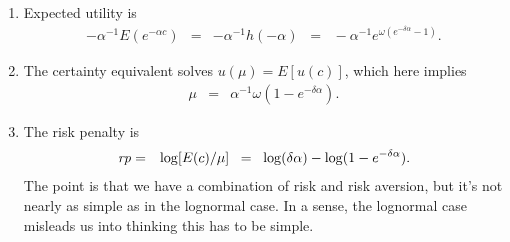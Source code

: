 \documentclass[11pt]{article}
\begin{document}
\begin{enumerate}
\begin{enumerate}
\item Expected utility is
\begin{eqnarray*}
 - \alpha^{-1} E(e^{-\alpha c}) &=& - \alpha^{-1} h(-\alpha)
            \;\;=\;\; - \alpha^{-1} e^{\omega (e^{-\delta\alpha } -1)} .
\end{eqnarray*}

\item The certainty equivalent solves $u(\mu) = E[u(c)]$, which here implies
\begin{eqnarray*}
    \mu &=& \alpha^{-1} \omega (1- e^{-\delta \alpha}) .
\end{eqnarray*}

\item The risk penalty is
\begin{eqnarray*}
    \mbox{\em rp\/} &=& \log [E(c)/\mu]
            \;\;=\;\; \log (\delta \alpha) - \log (1- e^{-\delta \alpha}) .
\end{eqnarray*}
The point is that we have a combination of risk and risk aversion,
but it's not nearly as simple as in the lognormal case.
In a sense, the lognormal case misleads us into thinking this has to be simple.
\end{enumerate}


\end{enumerate}



\end{document}
